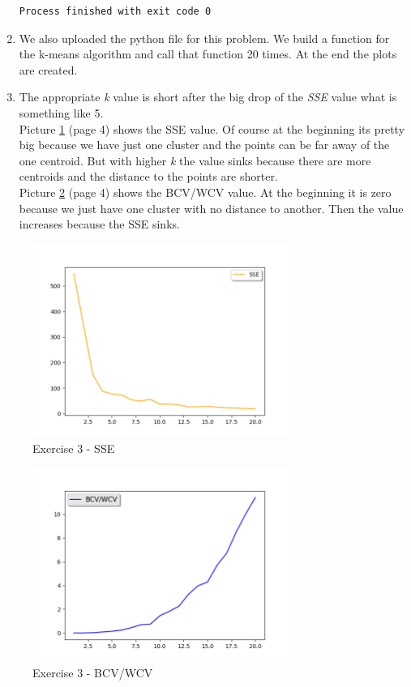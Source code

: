 \documentclass[11pt,a4paper]{scrartcl}
\begin{document}
\begin{enumerate}
\begin{lstlisting}
Process finished with exit code 0
\end{lstlisting}
\item We also uploaded the python file for this problem. We build a function for the k-means algorithm and call that function 20 times. At the end the plots are created.
\item The appropriate \textit{k} value is short after the big drop of the \textit{SSE} value what is something like 5.\\

Picture \ref{sse} (page 4) shows the SSE value. Of course at the beginning its pretty big because we have just one cluster and the points can be far away of the one centroid. But with higher \textit{k} the value sinks because there are more centroids and the distance to the points are shorter.\\

Picture \ref{bcv_wcv} (page 4) shows the BCV/WCV value. At the beginning it is zero because we just have one cluster with no distance to another. Then the value increases because the SSE sinks.
\end{enumerate}

\begin{figure}[htbp] 
  \centering
	\includegraphics[width=0.75\textwidth]{sse.png}
  \caption{Exercise 3 - SSE}
  \label{sse}
\end{figure}

\begin{figure}[htbp] 
  \centering
	\includegraphics[width=0.75\textwidth]{bcv_wcv.png}
  \caption{Exercise 3 - BCV/WCV}
  \label{bcv_wcv}
\end{figure}
\end{document}
